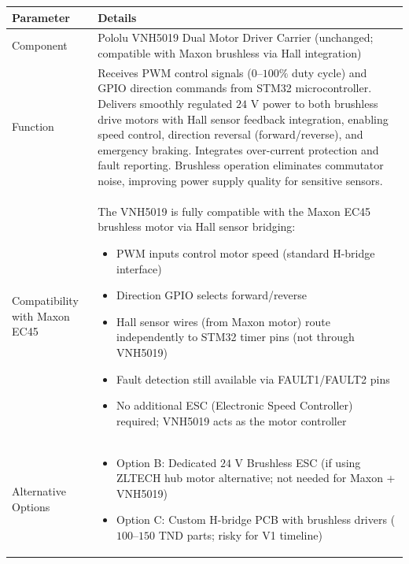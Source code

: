 \documentclass[12pt,a4paper]{article}
\begin{document}
\begin{longtable}{|p{4cm}|p{10cm}|}
\hline
\textbf{Parameter} & \textbf{Details} \\
\hline

Component &
Pololu VNH5019 Dual Motor Driver Carrier (unchanged; compatible with Maxon brushless via Hall integration) \\
\hline

Function &
Receives PWM control signals ($0$--$100\%$ duty cycle) and GPIO direction commands from STM32 microcontroller. Delivers smoothly regulated $24$ V power to both brushless drive motors with Hall sensor feedback integration, enabling speed control, direction reversal (forward/reverse), and emergency braking. Integrates over-current protection and fault reporting. Brushless operation eliminates commutator noise, improving power supply quality for sensitive sensors. \\
\hline

Compatibility with Maxon EC45 &
The VNH5019 is fully compatible with the Maxon EC45 brushless motor via Hall sensor bridging:
\begin{itemize}
\item PWM inputs control motor speed (standard H-bridge interface)
\item Direction GPIO selects forward/reverse
\item Hall sensor wires (from Maxon motor) route independently to STM32 timer pins (not through VNH5019)
\item Fault detection still available via FAULT1/FAULT2 pins
\item No additional ESC (Electronic Speed Controller) required; VNH5019 acts as the motor controller
\end{itemize}
\\
\hline

Alternative Options &
\begin{itemize}
\item Option B: Dedicated $24$ V Brushless ESC (if using ZLTECH hub motor alternative; not needed for Maxon + VNH5019)
\item Option C: Custom H-bridge PCB with brushless drivers ($100$--$150$ TND parts; risky for V1 timeline)
\end{itemize}
\\
\hline


\end{longtable}
\end{document}
